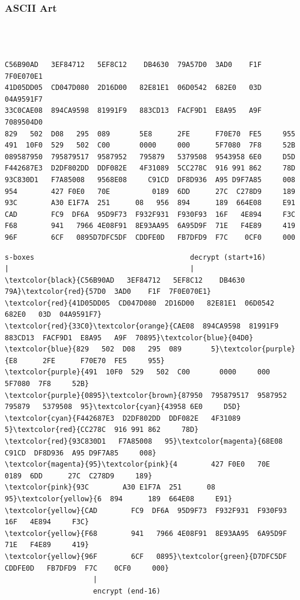 \documentclass{beamer}
\begin{document}
\begin{frame}[fragile]
\frametitle{ASCII Art}
\begin{overprint}
\scriptsize{
    \begin{Verbatim}[commandchars=\\\{\}]



C56B90AD   3EF84712   5EF8C12    DB4630  79A57D0  3AD0    F1F  7F0E070E1
41D05DD05  CD047D080  2D16D00   82E81E1  06D0542  682E0   03D  04A9591F7
33C0CAE08  894CA9598  81991F9   883CD13  FACF9D1  E8A95   A9F  7089504D0
829   502  D08   295  089       5E8      2FE      F70E70  FE5     955
491  10F0  529   502  C00       0000     000      5F7080  7F8     52B
089587950  795879517  9587952   795879   5379508  9543958 6E0     D5D
F442687E3  D2DF802DD  DDF082E   4F31089  5CC278C  916 991 862     78D
93C830D1   F7A85008   9568E08     C91CD  DF8D936  A95 D9F7A85     008
954        427 F0E0   70E          0189  6DD      27C  C278D9     189
93C        A30 E1F7A  251      08   956  894      189  664E08     E91
CAD        FC9  DF6A  95D9F73  F932F931  F930F93  16F   4E894     F3C
F68        941   7966 4E08F91  8E93AA95  6A95D9F  71E   F4E89     419
96F        6CF   0895D7DFC5DF  CDDFE0D   FB7DFD9  F7C    0CF0     000
    \end{Verbatim}
}
\scriptsize{
    \begin{Verbatim}[commandchars=\\\{\}]
s-boxes                                     decrypt (start+16)
|                                           |
\textcolor{black}{C56B90AD   3EF84712   5EF8C12    DB4630  79A}\textcolor{red}{57D0  3AD0    F1F  7F0E070E1}
\textcolor{red}{41D05DD05  CD047D080  2D16D00   82E81E1  06D0542  682E0   03D  04A9591F7}
\textcolor{red}{33C0}\textcolor{orange}{CAE08  894CA9598  81991F9   883CD13  FACF9D1  E8A95   A9F  70895}\textcolor{blue}{04D0}
\textcolor{blue}{829   502  D08   295  089       5}\textcolor{purple}{E8      2FE      F70E70  FE5     955}
\textcolor{purple}{491  10F0  529   502  C00       0000     000      5F7080  7F8     52B}
\textcolor{purple}{0895}\textcolor{brown}{87950  795879517  9587952   795879   5379508  95}\textcolor{cyan}{43958 6E0     D5D}
\textcolor{cyan}{F442687E3  D2DF802DD  DDF082E   4F31089  5}\textcolor{red}{CC278C  916 991 862     78D}
\textcolor{red}{93C830D1   F7A85008   95}\textcolor{magenta}{68E08     C91CD  DF8D936  A95 D9F7A85     008}
\textcolor{magenta}{95}\textcolor{pink}{4        427 F0E0   70E          0189  6DD      27C  C278D9     189}
\textcolor{pink}{93C        A30 E1F7A  251      08   95}\textcolor{yellow}{6  894      189  664E08     E91}
\textcolor{yellow}{CAD        FC9  DF6A  95D9F73  F932F931  F930F93  16F   4E894     F3C}
\textcolor{yellow}{F68        941   7966 4E08F91  8E93AA95  6A95D9F  71E   F4E89     419}
\textcolor{yellow}{96F        6CF   0895}\textcolor{green}{D7DFC5DF  CDDFE0D   FB7DFD9  F7C    0CF0     000}
                     |
                     encrypt (end-16)


\end{Verbatim}}
\end{overprint}
\end{frame}
\end{document}

